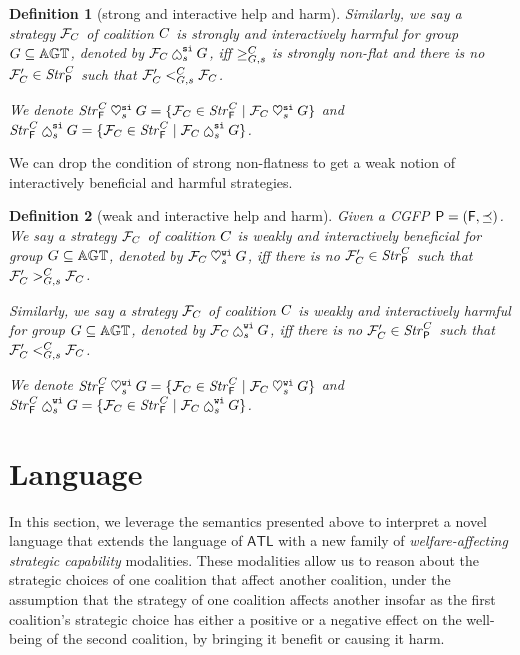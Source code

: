 \documentclass{article}
\newtheorem{definition}{Definition}
\begin{document}
{\begin{definition}[strong and interactive help and harm]
 Similarly, we say a strategy $\mathcal{F}_C$ of coalition $C$ is strongly and interactively harmful for group $G\subseteq \mathbb{AGT}$, denoted by $\js_C\harm^\mathtt{si}_s\Group$, iff $\geq^C_{G,s}$ is strongly non-flat and there is no $\mathcal{F}_C'\in\mathit{Str}^C_{\mathsf{P}}$ such that $\mathcal{F}_C'<^C_{G,s}\mathcal{F}_C$.
 
We denote $\mathit{Str}_{\mathsf{F}}^C\mathbin{\heartsuit}^{\mathtt{si}}_sG = \{\mathcal{F}_C\in \mathit{Str}^C_{\mathsf{F}}\mid \mathcal{F}_C\mathbin{\heartsuit}^{\mathtt{si}}_sG\}$ and $\Js_{\F}^C\harm^\si_s\Group = \{\js_\Coalition\in \Js^C_\F\mid \js_C\harm^\si_s\Group\}$.
\end{definition}

We can drop the condition of strong non-flatness to get a weak notion of interactively beneficial and harmful strategies.
\begin{definition}[weak and interactive help and harm]\label{def: weak and interactive help and harm}
 Given a CGFP $\mathsf{P} = (\mathsf{F}, \preceq)$. We say a strategy $\mathcal{F}_C$ of coalition $C$ is weakly and interactively beneficial for group $G\subseteq \mathbb{AGT}$, denoted by $\mathcal{F}_C\mathbin{\heartsuit}^\mathtt{wi}_sG$, iff there is no $\mathcal{F}_C'\in\mathit{Str}^C_{\mathsf{P}}$ such that $\mathcal{F}_C'>^C_{G,s}\mathcal{F}_C$.

 Similarly, we say a strategy $\mathcal{F}_C$ of coalition $C$ is weakly and interactively harmful for group $G\subseteq \mathbb{AGT}$, denoted by $\js_C\harm^\mathtt{wi}_s\Group$, iff there is no $\mathcal{F}_C'\in\mathit{Str}^C_{\mathsf{P}}$ such that $\mathcal{F}_C'<^C_{G,s}\mathcal{F}_C$.
 
We denote $\mathit{Str}_{\mathsf{F}}^C\mathbin{\heartsuit}^{\mathtt{wi}}_sG = \{\mathcal{F}_C\in \mathit{Str}^C_{\mathsf{F}}\mid \mathcal{F}_C\mathbin{\heartsuit}^{\mathtt{wi}}_sG\}$ and $\Js_{\F}^C\harm^\wi_s\Group = \{\js_\Coalition\in \Js^C_\F\mid \js_C\harm^\wi_s\Group\}$.
\end{definition}

}





\section{Language }\label{sec:languages}


In this section, we leverage the semantics presented above to interpret a novel language that extends the language of $\mathsf{ATL}$ with a new family of \emph{welfare-affecting strategic capability} modalities. These modalities allow us to reason about the strategic choices of one coalition that affect another coalition, under the assumption that the strategy of one coalition affects another insofar as the first coalition's strategic choice has either a positive or a negative effect on the well-being of the second coalition, by bringing it benefit or causing it harm.
\end{document}
